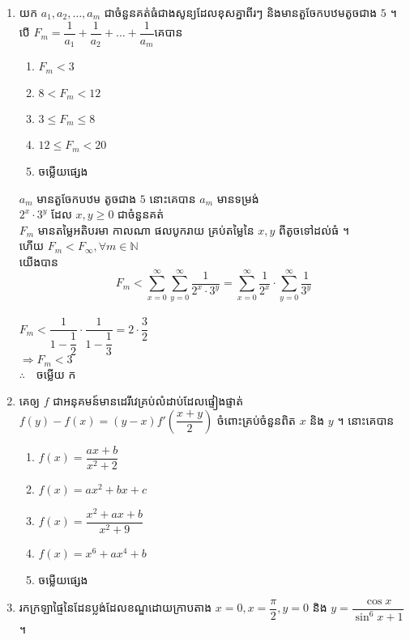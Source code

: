 \documentclass[a4paper,12pt]{article}
\begin{document}
\begin{enumerate}[m]
\begin{center}
	\end{center}
	{\color{blue}\hrulefill}
	\item យក $a_1,a_2,\dots,a_m$ ជាចំនួនគត់ធំជាងសូន្យដែលខុសគ្នាពីរៗ និងមានតួចែកបឋមតូចជាង $5$ ។ បើ $F_m=\dfrac{1}{a_1}+\dfrac{1}{a_2}+\dots+\dfrac{1}{a_m}$គេបាន\\
	\begin{enumerate}[k,5]
		\item $F_m<3$
		\item $8<F_m<12$
		\item $3\le F_m\le 8$
		\item $12\le F_m<20$
		\item ចម្លើយផ្សេង
	\end{enumerate}
	\answer
	\begin{center}
		$a_m$ មានតួចែកបឋម តូចជាង $5$ នោះគេបាន $a_m$ មានទម្រង់\\
		$2^x\cdot3^y$ ដែល $x,y\ge0$ ជាចំនួនគត់\\
		$F_m$ មានតម្លៃអតិបរមា កាលណា ផលបូករាយ គ្រប់តម្លៃនៃ $x,y$ ពីតូចទៅដល់ធំ ។\\
		ហើយ $F_m<F_\infty, \forall m\in\mathbb{N}$\\
		យើងបាន $$F_m<\sum_{x=0}^{\infty}\sum_{y=0}^{\infty}\dfrac{1}{2^x\cdot3^y}=\sum_{x=0}^{\infty}\dfrac{1}{2^x}\cdot\sum_{y=0}^{\infty}\dfrac{1}{3^y}$$\\ 
		$F_m<\dfrac{1}{1-\dfrac{1}{2}}\cdot\dfrac{1}{1-\dfrac{1}{3}}=2\cdot\dfrac{3}{2}$\\
		$\Rightarrow F_m<3$\\
		$\therefore \quad $\kml ចម្លើយ \kbk ក
	\end{center}
	{\color{blue}\hrulefill}
	\item គេឲ្យ $f$ ជាអនុគមន៍មានដេរីវេគ្រប់លំដាប់ដែលផ្ទៀងផ្ទាត់ $f(y)-f(x)=\left(y-x\right)f'\left(\dfrac{x+y}{2}\right)$ ចំពោះគ្រប់ចំនួនពិត $x$ និង $y$ ។ នោះគេបាន
		\begin{enumerate}[k,3]
			\item $f(x)=\dfrac{ax+b}{x^2+2}$
			\item $f(x)=ax^2+bx+c$
			\item $f(x)=\dfrac{x^2+ax+b}{x^2+9}$
			\item $f(x)=x^6+ax^4+b$
			\item ចម្លើយផ្សេង
		\end{enumerate}
	\answer
	{\color{blue}\hrulefill}
	\item រកក្រឡាផ្ទៃនៃដែនប្លង់ដែលខណ្ឌដោយក្រាបតាង $x=0,x=\dfrac{\pi}{2},y=0$ និង $y=\dfrac{\cos x}{\sin^6x+1}$ ។
	\begin{enumerate}[k,3]

\end{enumerate}
\end{enumerate}
\end{document}
